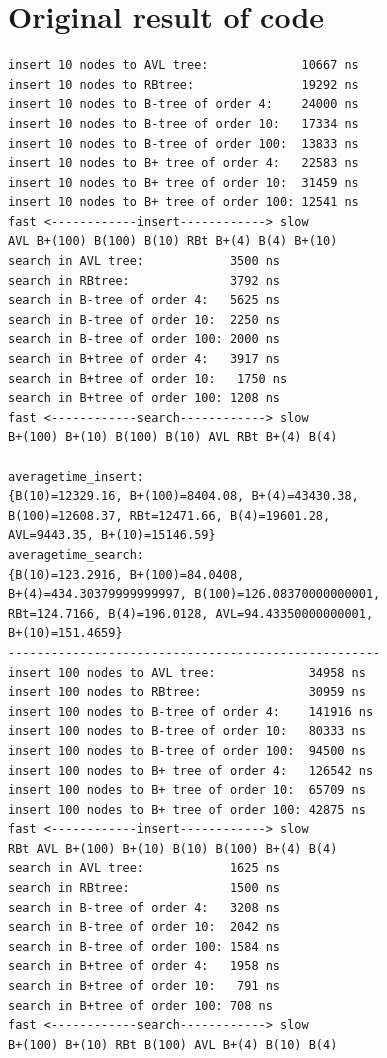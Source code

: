 \documentclass{article}
\begin{document}
\section{Original result of code}\label{result}
\begin{verbatim}
insert 10 nodes to AVL tree:             10667 ns
insert 10 nodes to RBtree:               19292 ns
insert 10 nodes to B-tree of order 4:    24000 ns
insert 10 nodes to B-tree of order 10:   17334 ns
insert 10 nodes to B-tree of order 100:  13833 ns
insert 10 nodes to B+ tree of order 4:   22583 ns
insert 10 nodes to B+ tree of order 10:  31459 ns
insert 10 nodes to B+ tree of order 100: 12541 ns
fast <------------insert------------> slow
AVL B+(100) B(100) B(10) RBt B+(4) B(4) B+(10) 
search in AVL tree:            3500 ns
search in RBtree:              3792 ns
search in B-tree of order 4:   5625 ns
search in B-tree of order 10:  2250 ns
search in B-tree of order 100: 2000 ns
search in B+tree of order 4:   3917 ns
search in B+tree of order 10:   1750 ns
search in B+tree of order 100: 1208 ns
fast <------------search------------> slow
B+(100) B+(10) B(100) B(10) AVL RBt B+(4) B(4) 

averagetime_insert:
{B(10)=12329.16, B+(100)=8404.08, B+(4)=43430.38, 
B(100)=12608.37, RBt=12471.66, B(4)=19601.28, 
AVL=9443.35, B+(10)=15146.59}
averagetime_search:
{B(10)=123.2916, B+(100)=84.0408, 
B+(4)=434.30379999999997, B(100)=126.08370000000001, 
RBt=124.7166, B(4)=196.0128, AVL=94.43350000000001, 
B+(10)=151.4659}
----------------------------------------------------
insert 100 nodes to AVL tree:             34958 ns
insert 100 nodes to RBtree:               30959 ns
insert 100 nodes to B-tree of order 4:    141916 ns
insert 100 nodes to B-tree of order 10:   80333 ns
insert 100 nodes to B-tree of order 100:  94500 ns
insert 100 nodes to B+ tree of order 4:   126542 ns
insert 100 nodes to B+ tree of order 10:  65709 ns
insert 100 nodes to B+ tree of order 100: 42875 ns
fast <------------insert------------> slow
RBt AVL B+(100) B+(10) B(10) B(100) B+(4) B(4) 
search in AVL tree:            1625 ns
search in RBtree:              1500 ns
search in B-tree of order 4:   3208 ns
search in B-tree of order 10:  2042 ns
search in B-tree of order 100: 1584 ns
search in B+tree of order 4:   1958 ns
search in B+tree of order 10:   791 ns
search in B+tree of order 100: 708 ns
fast <------------search------------> slow
B+(100) B+(10) RBt B(100) AVL B+(4) B(10) B(4) 


\end{verbatim}
\end{document}
